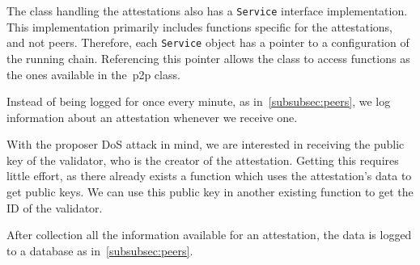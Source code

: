 The class handling the attestations also has a \texttt{Service} interface implementation.
This implementation primarily includes functions specific for the attestations, and not peers.
Therefore, each \texttt{Service} object has a pointer to a configuration of the running chain.
Referencing this pointer allows the class to access functions as the ones available in the~\gls{p2p} class.

Instead of being logged for once every minute, as in~\autoref{subsubsec:peers},
we log information about an attestation whenever we receive one.

With the proposer DoS attack in mind, we are interested in receiving the public key of the validator,
who is the creator of the attestation.
Getting this requires little effort,
as there already exists a function which uses the attestation's data to get public keys.
We can use this public key in another existing function to get the ID of the validator.

After collection all the information available for an attestation,
the data is logged to a database as in~\autoref{subsubsec:peers}.